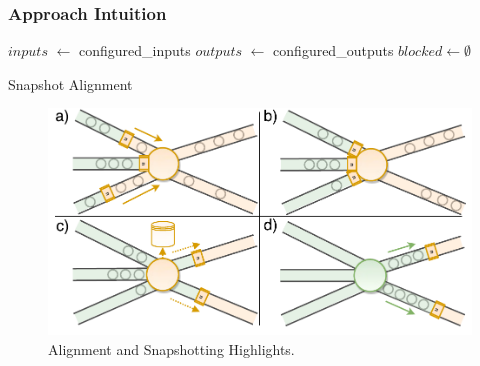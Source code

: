 \subsubsection{Approach Intuition}


\begin{algorithm}[t]
$inputs$ $\leftarrow$ configured\_inputs\;
$outputs$ $\leftarrow$ configured\_outputs\;
$blocked \leftarrow \emptyset$ \;

\caption{Snapshot Alignment}
\label{alg:snapdag}
\end{algorithm}

\begin{figure}[t]
\centering
\includegraphics[width=\textwidth / 2]{figures/snapshots-highlights.pdf}
\caption{Alignment and Snapshotting Highlights.} 
\label{fig:snapshots-highlights}
\vspace{-4mm}
\end{figure}


